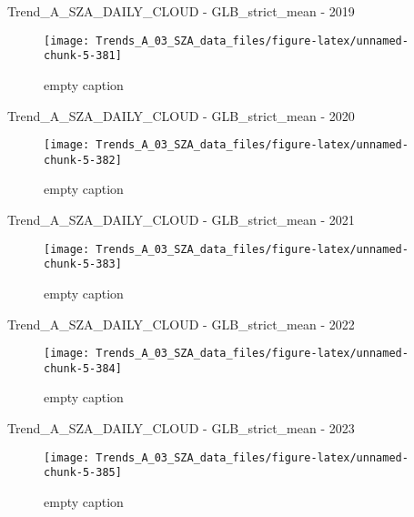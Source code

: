 \documentclass[
  10pt,
  a4paper,oneside]{article}
\begin{document}
Trend\_A\_SZA\_DAILY\_CLOUD - GLB\_strict\_mean - 2019

\begin{figure}[!ht]

{\centering \texttt{[image: Trends\_A\_03\_SZA\_data\_files/figure-latex/unnamed-chunk-5-381]} 

}

\caption{ empty caption }\label{fig:unnamed-chunk-5-381}
\end{figure}

Trend\_A\_SZA\_DAILY\_CLOUD - GLB\_strict\_mean - 2020

\begin{figure}[!ht]

{\centering \texttt{[image: Trends\_A\_03\_SZA\_data\_files/figure-latex/unnamed-chunk-5-382]} 

}

\caption{ empty caption }\label{fig:unnamed-chunk-5-382}
\end{figure}

Trend\_A\_SZA\_DAILY\_CLOUD - GLB\_strict\_mean - 2021

\begin{figure}[!ht]

{\centering \texttt{[image: Trends\_A\_03\_SZA\_data\_files/figure-latex/unnamed-chunk-5-383]} 

}

\caption{ empty caption }\label{fig:unnamed-chunk-5-383}
\end{figure}

Trend\_A\_SZA\_DAILY\_CLOUD - GLB\_strict\_mean - 2022

\begin{figure}[!ht]

{\centering \texttt{[image: Trends\_A\_03\_SZA\_data\_files/figure-latex/unnamed-chunk-5-384]} 

}

\caption{ empty caption }\label{fig:unnamed-chunk-5-384}
\end{figure}

Trend\_A\_SZA\_DAILY\_CLOUD - GLB\_strict\_mean - 2023

\begin{figure}[!ht]

{\centering \texttt{[image: Trends\_A\_03\_SZA\_data\_files/figure-latex/unnamed-chunk-5-385]} 

}

\caption{ empty caption }\label{fig:unnamed-chunk-5-385}
\end{figure}
\end{document}
